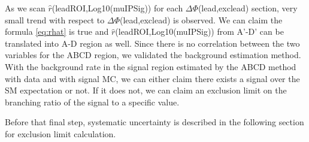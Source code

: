 As we scan $\hat{r}$(leadROI,Log10(muIPSig)) for each $\Delta\Phi$(lead,exclead) section, very small trend with respect to $\Delta\Phi$(lead,exclead) is observed.
We can claim the formula \ref{eq:rhat} is true and $\hat{r}$(leadROI,Log10(muIPSig)) from A'-D' can be translated into A-D region as well.
Since there is no correlation between the two variables for the ABCD region, we validated the background estimation method.
With the background rate in the signal region estimated by the ABCD method with data and with signal MC, we can either claim there exists a signal over the SM expectation or not.
If it does not, we can claim an exclusion limit on the branching ratio of the signal to a specific value.

Before that final step, systematic uncertainty is described in the following section for exclusion limit calculation.

